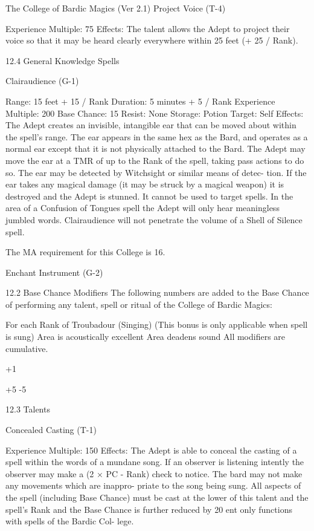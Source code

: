 \begin{Chapter}{The College of Bardic Magics (Ver 2.1)}
Project Voice (T-4) 

Experience Multiple: 75 
Effects: The talent allows the Adept to project their 
voice  so  that  it  may  be  heard  clearly  everywhere 
within 25 feet (+ 25 / Rank). 

12.4 General Knowledge Spells 

Clairaudience (G-1) 

Range: 15 feet + 15 / Rank 
Duration: 5 minutes + 5 / Rank 
Experience Multiple: 200 
Base Chance: 15%
Resist: None  
Storage: Potion 
Target: Self 
Effects:  The  Adept  creates  an  invisible,  intangible 
ear  that  can  be  moved  about  within  the  spell’s 
range. The ear appears in the same hex as the Bard, 
and  operates  as  a  normal  ear  except  that  it  is  not 
physically  attached  to  the  Bard.  The  Adept  may 
move  the  ear  at  a  TMR  of  up  to  the  Rank  of  the 
spell, taking pass actions to do so. The ear may be 
detected  by  Witchsight  or  similar  means  of  detec-
tion.  If  the  ear  takes  any  magical  damage  (it  may 
be struck by a magical weapon) it is destroyed and 
the  Adept  is  stunned.  It  cannot  be  used  to  target 
spells. In the area of a Confusion of Tongues spell 
the  Adept  will  only  hear  meaningless  jumbled 
words. Clairaudience will not penetrate the volume 
of a Shell of Silence spell. 

The MA requirement for this College is 16. 

Enchant Instrument (G-2) 

12.2 Base Chance Modifiers 
The  following  numbers  are  added  to  the  Base 
Chance  of  performing  any  talent,  spell  or  ritual  of 
the College of Bardic Magics: 

For each Rank of Troubadour (Singing) 
(This bonus is only applicable when spell is 
sung) 
Area is acoustically excellent 
Area deadens sound 
All modifiers are cumulative. 

+1 

+5 
-5 

12.3 Talents  

Concealed Casting (T-1)  

Experience Multiple: 150 
Effects: The Adept is able to conceal the casting of 
a  spell  within  the  words  of  a  mundane  song.  If  an 
observer  is  listening  intently  the  observer  may 
make a (2 × PC - Rank) check to notice. The bard 
may  not  make  any  movements  which  are  inappro-
priate  to  the  song  being  sung.  All  aspects  of  the 
spell  (including  Base  Chance)  must  be  cast  at  the 
lower  of  this  talent  and  the  spell’s  Rank  and  the 
Base Chance is further reduced by 20%
ent  only  functions  with  spells  of  the  Bardic  Col-
lege. 


\end{Chapter}
